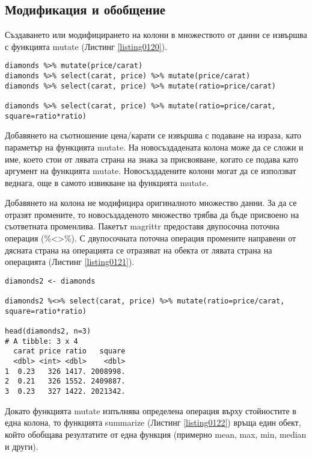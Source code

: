 \subsection{Модификация и обобщение}

Създаването или модифицирането на колони в множеството от данни се извършва с функцията mutate (Листинг \ref{listing0120}). 

\begin{lstlisting}[caption=Модификация на колони, label=listing0120]
diamonds %>% mutate(price/carat)
diamonds %>% select(carat, price) %>% mutate(price/carat)
diamonds %>% select(carat, price) %>% mutate(ratio=price/carat)

diamonds %>% select(carat, price) %>% mutate(ratio=price/carat, square=ratio*ratio)
\end{lstlisting}

Добавянето на съотношение цена/карати се извършва с подаване на израза, като параметър на функцията mutate. На новосъздадената колона може да се сложи и име, което стои от лявата страна на знака за присвояване, когато се подава като аргумент на функцията mutate. Новосъздадените колони могат да се използват веднага, още в самото извикване на функцията mutate. 

Добавянето на колона не модифицира оригиналното множество данни. За да се отразят промените, то новосъздаденото множество трябва да бъде присвоено на съответната променлива. Пакетът magrittr предоставя двупосочна поточна операция (\%<>\%). С двупосочната поточна операция промените направени от дясната страна на операцията се отразяват на обекта от лявата страна на операцията (Листинг \ref{listing0121}). 

\begin{lstlisting}[caption=Отразяване на модификациите, label=listing0121]
diamonds2 <- diamonds

diamonds2 %<>% select(carat, price) %>% mutate(ratio=price/carat, square=ratio*ratio)

head(diamonds2, n=3)
# A tibble: 3 x 4
  carat price ratio   square
  <dbl> <int> <dbl>    <dbl>
1  0.23   326 1417. 2008998.
2  0.21   326 1552. 2409887.
3  0.23   327 1422. 2021342.
\end{lstlisting}

Докато функцията mutate изпълнява определена операция върху стойностите в една колона, то функцията summarize (Листинг \ref{listing0122}) връща един обект, който обобщава резултатите от една функция (примерно mean, max, min, median и други). 

